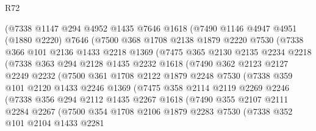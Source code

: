 \begin{lexlean}{R72}
\begin{coremodule}
        (@7338
          @1147
          @294
          @4952
          @1435
          @7646
          @1618
          (@7490
            @1146
            @4947
            @4951
            (@1880 @2220)
            @7646
            (@7500
              @368
              @1708
              @2138
              @1879
              @2220
              @7530
              (@7338
                @366
                @101
                @2136
                @1433
                @2218
                @1369
                (@7475
                  @365
                  @2130
                  @2135
                  @2234
                  @2218
                  (@7338
                    @363
                    @294
                    @2128
                    @1435
                    @2232
                    @1618
                    (@7490
                      @362
                      @2123
                      @2127
                      @2249
                      @2232
                      (@7500
                        @361
                        @1708
                        @2122
                        @1879
                        @2248
                        @7530
                        (@7338
                          @359
                          @101
                          @2120
                          @1433
                          @2246
                          @1369
                          (@7475
                            @358
                            @2114
                            @2119
                            @2269
                            @2246
                            (@7338
                              @356
                              @294
                              @2112
                              @1435
                              @2267
                              @1618
                              (@7490
                                @355
                                @2107
                                @2111
                                @2284
                                @2267
                                (@7500
                                  @354
                                  @1708
                                  @2106
                                  @1879
                                  @2283
                                  @7530
                                  (@7338
                                    @352
                                    @101
                                    @2104
                                    @1433
                                    @2281

\end{coremodule}
\end{lexlean}
